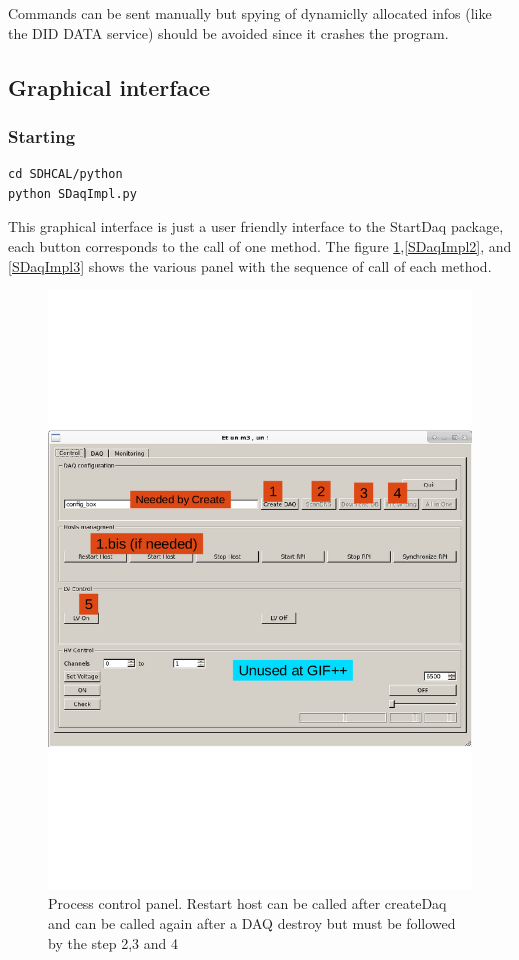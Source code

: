 \documentclass[english]{article}
\begin{document}
Commands can be sent manually but spying of dynamiclly allocated infos (like the DID DATA service) should be avoided since it crashes the program. 
\subsection{Graphical interface}
\subsubsection{Starting}
\begin{verbatim}
cd SDHCAL/python
python SDaqImpl.py
\end{verbatim}

This graphical interface is just a user friendly interface to the StartDaq package, each button corresponds to the call of one method. The figure \ref{SDaqImpl1},\ref{SDaqImpl2}, and \ref{SDaqImpl3} shows the various panel with the sequence of call of each method.
\begin{figure}[htp]
\centering
\includegraphics[width=1.\textwidth]{./SDaqImpl1.png}
\caption{Process control panel. Restart host can be called after createDaq and can be called again after a DAQ destroy but must be followed by the step 2,3 and 4}
\label{SDaqImpl1}
\end{figure}
\end{document}
